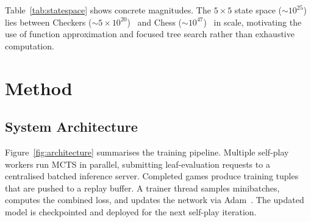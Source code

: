 \documentclass[11pt]{article}
\begin{document}
Table~\ref{tab:statespace} shows concrete magnitudes. The $5{\times}5$
state space ($\sim\!10^{25}$) lies between Checkers ($\sim\!5 \times
10^{20}$)~\cite{schaeffer2007checkers} and
Chess ($\sim\!10^{47}$)~\cite{silver2018general} in scale, motivating the
use of function approximation and focused tree search rather than
exhaustive computation.

\section{Method}
\label{sec:method}

\subsection{System Architecture}
\label{sec:architecture}

Figure~\ref{fig:architecture} summarises the training pipeline. Multiple
self-play workers run MCTS in parallel, submitting leaf-evaluation
requests to a centralised batched inference server. Completed games
produce training tuples that are pushed to a replay buffer. A trainer
thread samples minibatches, computes the combined loss, and updates the
network via Adam~\cite{kingma2015adam}. The updated model is
checkpointed and deployed for the next self-play iteration.
\end{document}

